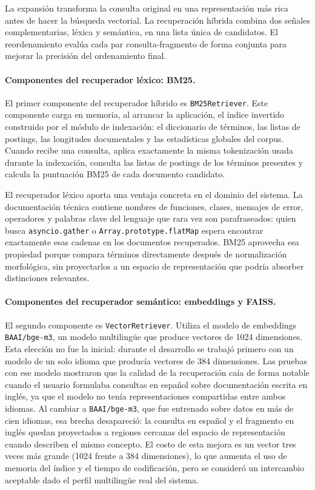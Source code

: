\documentclass[11pt]{article}
\begin{document}
La expansión transforma la consulta original en una representación más rica antes de hacer la
búsqueda vectorial. La recuperación híbrida combina dos señales complementarias, léxica y
semántica, en una lista única de candidatos. El reordenamiento evalúa cada par consulta-fragmento
de forma conjunta para mejorar la precisión del ordenamiento final.

\paragraph{Componentes del recuperador léxico: BM25.}
El primer componente del recuperador híbrido es \texttt{BM25Retriever}. Este componente carga en
memoria, al arrancar la aplicación, el índice invertido construido por el módulo de indexación:
el diccionario de términos, las listas de postings, las longitudes documentales y las estadísticas
globales del corpus. Cuando recibe una consulta, aplica exactamente la misma tokenización usada
durante la indexación, consulta las listas de postings de los términos presentes y calcula la
puntuación BM25 de cada documento candidato.

El recuperador léxico aporta una ventaja concreta en el dominio del sistema. La documentación
técnica contiene nombres de funciones, clases, mensajes de error, operadores y palabras clave
del lenguaje que rara vez son parafraseados: quien busca \texttt{asyncio.gather} o
\texttt{Array.prototype.flatMap} espera encontrar exactamente esas cadenas en los documentos
recuperados. BM25 aprovecha esa propiedad porque compara términos directamente después de
normalización morfológica, sin proyectarlos a un espacio de representación que podría absorber
distinciones relevantes.

\paragraph{Componentes del recuperador semántico: embeddings y FAISS.}
El segundo componente es \texttt{VectorRetriever}. Utiliza el modelo de embeddings
\texttt{BAAI/bge-m3}, un modelo multilingüe que produce vectores de 1024 dimensiones. Esta
elección no fue la inicial: durante el desarrollo se trabajó primero con un modelo de un solo
idioma que producía vectores de 384 dimensiones. Las pruebas con ese modelo mostraron que la
calidad de la recuperación caía de forma notable cuando el usuario formulaba consultas en
español sobre documentación escrita en inglés, ya que el modelo no tenía representaciones
compartidas entre ambos idiomas. Al cambiar a \texttt{BAAI/bge-m3}, que fue entrenado sobre
datos en más de cien idiomas, esa brecha desapareció: la consulta en español y el fragmento
en inglés quedan proyectados a regiones cercanas del espacio de representación cuando
describen el mismo concepto. El costo de esta mejora es un vector tres veces más grande
(1024 frente a 384 dimensiones), lo que aumenta el uso de memoria del índice y el tiempo de
codificación, pero se consideró un intercambio aceptable dado el perfil multilingüe real del
sistema.
\end{document}
